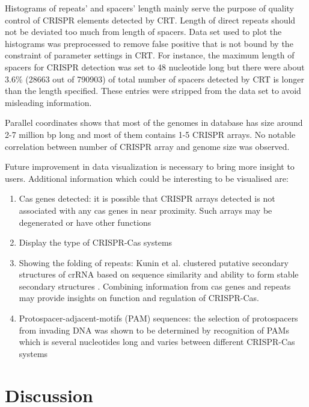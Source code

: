 \documentclass[11pt, a4paper,titlepage]{article}
\begin{document}
Histograms of repeats’ and spacers’ length mainly serve the purpose of
quality control of CRISPR elements detected by CRT. Length of direct
repeats should not be deviated too much from length of spacers. Data
set used to plot the histograms was preprocessed to remove false
positive that is not bound by the constraint of parameter settings in
CRT. For instance, the maximum length of spacers for CRISPR detection
was set to 48 nucleotide long but there were about 3.6\% (28663 out of
790903) of total number of spacers detected by CRT is longer than the
length specified. These entries were stripped from the data set to
avoid misleading information.

Parallel coordinates shows that most of the genomes in database has
size around 2-7 million bp long and most of them contains 1-5 CRISPR
arrays. No notable correlation between number of CRISPR array and
genome size was observed.

Future improvement in data visualization is necessary to bring more
insight to users. Additional information which could be interesting to
be visualised are:
\begin{enumerate}
\item Cas genes detected: it is possible that CRISPR arrays detected
  is not associated with any cas genes in near proximity. Such arrays
  may be degenerated or have other functions
  \cite{mandin2007identification}
\item Display the type of CRISPR-Cas systems 
\item Showing the folding of repeats: Kunin et al. clustered putative
  secondary structures of crRNA based on sequence similarity and
  ability to form stable secondary structures
  \cite{kunin2007evolutionary}. Combining information from cas genes
  and repeats may provide insights on function and regulation of
  CRISPR-Cas.
\item Protospacer-adjacent-motifs (PAM) sequences: the selection of
  protospacers from invading DNA was shown to be determined by
  recognition of PAMs which is several nucleotides long and varies
  between different CRISPR-Cas systems
  \cite{mojica2009short,deveau2008phage}
\end{enumerate}

\section{Discussion}
\end{document}
